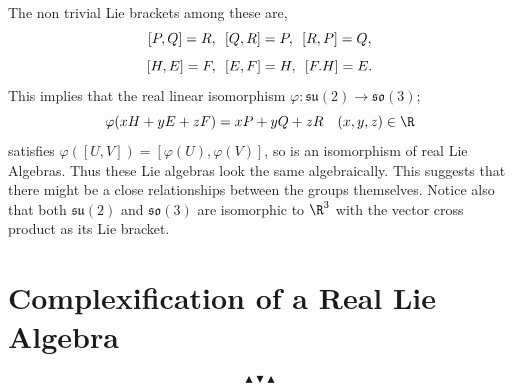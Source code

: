The non trivial Lie brackets among these are,
\[ [P,Q]=R,\hspace{5px}[Q,R]=P,\hspace{5px}[R,P]=Q, \]
\[ [H,E]=F,\hspace{5px}[E,F]=H,\hspace{5px}[F.H]=E. \]
This implies that the real linear isomorphism \(\varphi:\mathfrak{su}(2)\longrightarrow\mathfrak{so}(3)\);
\[ \varphi(xH+yE+zF)=xP+yQ+zR \hspace{10px} (x,y,z)\in\R \]
satisfies \(\varphi([U,V])=[\varphi(U),\varphi(V)]\), so is an isomorphism of real Lie Algebras.
Thus these Lie algebras look the same algebraically. This suggests that there might be a
close relationships between the groups themselves. Notice also that both \(\mathfrak{su}(2)\)
and \(\mathfrak{so}(3)\) are isomorphic to \(\R^3\) with the vector cross product as its
Lie bracket.




\section{Complexification of a Real Lie Algebra}

\[ \blacktriangle \blacktriangledown \blacktriangle \]
